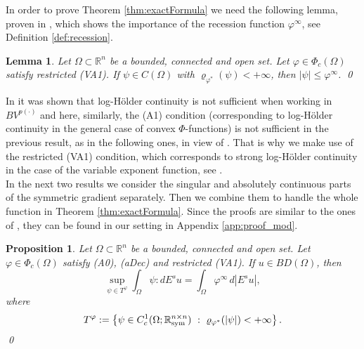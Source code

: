 \documentclass[a4paper,11pt,oneside,notitlepage]{article}
\newtheorem{proposition}[theorem]{Proposition}
\newtheorem{lemma}[theorem]{Lemma}
\numberwithin{equation}{section}
\def\R{\mathbb{R}}
\def\sym{{\rm sym}}
\newcommand{\vphi}{\varphi}
\newcommand{\vrho}{\varrho}
\newcommand{\st}{ \ : \ }
\begin{document}
In order to prove Theorem \ref{thm:exactFormula} we need the following lemma, proven in \cite[Lemma 6.1]{EHH}, which shows the importance of the recession function $\vphi^\infty$, see Definition \ref{def:recession}.

\begin{lemma}
\label{lem:bound}
    Let $\Omega \subset \R^n$ be a bounded, connected and open set. Let $\vphi \in \Phi_c(\Omega)$ satisfy restricted (VA1). If $\psi \in C(\Omega)$ with $\vrho_{\vphi^*}(\psi) < +\infty$, then $|\psi| \le \vphi^\infty$.
    \qed
\end{lemma}

In \cite[Section 3 \& Example A.1]{HHL} it was shown that log-H\"older continuity is not sufficient when working in $BV^{p(\cdot)}$ and here, similarly, the (A1) condition (corresponding to log-H\"older continuity in the general case of convex $\Phi$-functions) is not sufficient in the previous result, as in the following ones, in view of \cite[Example 4.3]{EHH}. That is why we make use of the restricted (VA1) condition, which corresponds to strong log-H\"older continuity in the case of the variable exponent function, see \cite[Proposition 3.2]{EHH}. 
\\
In the next two results we consider the singular and absolutely continuous parts of the symmetric gradient separately. Then we combine them to handle the whole function in Theorem \ref{thm:exactFormula}. Since the proofs are similar to the ones of \cite[Propositions 6.2 \& 6.3]{EHH}, they can be found in our setting in Appendix \ref{app:proof_mod}.


\begin{proposition}
\label{prop:singularPart}
    Let $\Omega \subset \R^n$ be a bounded, connected and open set. Let $\vphi \in \Phi_c(\Omega)$ satisfy (A0), (aDec) and restricted (VA1). If $u \in BD(\Omega)$, then
    \begin{equation*}
        \sup_{\psi \in T^\vphi} \int_\Omega \psi : dE^su = \int_\Omega \vphi^\infty \, d|E^su|,
    \end{equation*}
    where 
    \begin{equation}
    \label{def_test}
        T^\vphi := \left\{ \psi \in C^1_c(\Omega; \R^{n \times n}_\sym) \st \vrho_{\vphi^*}(|\psi|) < +\infty \right\}.
    \end{equation}
    \qed
\end{proposition}

\end{document}
